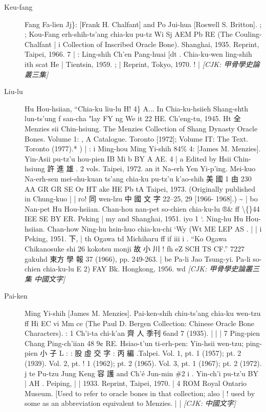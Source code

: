 \begin{description}
  \item[Keu-fang] Fang Fa-lien Jj\}: [Frank H. Chalfant] and Po Jui-hua [Roswell S. Britton]. ; ; Kou-Fang erh-shih-ts'ang chia-ku pu-tz Wi Sj AEM Pb RE (The Couling-Chalfant | i Collection of Inscribed Oracle Bone). Shanghai, 1935. Reprint, Taipei, 1966. 7 | : Ling-shih Ch'en Pang-huai [dt . Chia-ku-wen ling-shih ith scat He | Tientsin, 1959. ; | Reprint, Tokyo, 1970. ! | \hfill\textit{[CJK: 甲骨學史論叢三集]}
  \item[Liu-lu] Hu Hou-hsiian, ``Chia-ku liu-lu H! 4\} A... In Chia-ku-hsiieh Shang-shth lun-ts'ung f san-cha "lay FY ng We it 22 HE. Ch'eng-tu, 1945. Ht 全 Menzies sii Chin-hsiung. The Menzies Collection of Shang Dynasty Oracle Bones. Volume 1: , A Catalogue. Toronto [1972]; Volume IT: The Text. Toronto (1977).* ) | : i Ming-hou Ming Yi-shih 84\% 4: [James M. Menzies]. Yin-Asii pu-tz'u hou-pien IB Mi b BY A AE. 4 | a Edited by Hsii Chin-hsiung 許 進 雄 . 2 vols. Taipei, 1972. an it Na-erh Yen Yi-p'ing. Mei-kuo Na-erh-sen mei-shu-kuan ts'ang chia-ku pu-tz'u k'ao-shih 美 國 1 由 230 AA GR GR SE Or HT ake HE Pb tA Taipei, 1973. (Originally published in Chung-kuo | | ro! 同 wen-lzu 中 國 文 字 22--25, 29 [1966- 1968].) \~{} | bo Nan-pet Hu Hou-hsiian. Chan-hou nan-pet so-chien chia-ku-lu ®\& ff \textbackslash\{\}44 IEE SE BY ER. Peking | my and Shanghai, 1951. iyo 1 `. Ning-hu Hu Hou-hsiian. Chan-how Ning-hu hsin-huo chia-ku-chi `Wy (Wt ME LEP AS . | | i Peking, 1951. 下, | th Ogawa td Michiharu ff if iii i . ``Ko Ogawa Chikanosuke shi 26 kokotsu monji 故 小 川 ! fh eZ SCH TS CF.'' 7227 gakuhd 東方 學 報 37 (1966), pp. 249-263. | be Pa-li Jao Tsung-yi. Pa-li so-chien chia-ku-lu E 2) FAY Bk. Hongkong, 1956. wd \hfill\textit{[CJK: 甲骨學史論叢三集 中國文字]}
  \item[Pai-ken] Ming Yi-shih [James M. Menzies]. Pai-ken-shih chiu-ts'ang chia-ku wen-tzu ff Hi EC vi Mm ce (The Paul D. Bergen Collection: Chinese Oracle Bone Characters). : 1 Ch'i-ta chi-k'an 齊 人 季刊 6and 7 (1935). | | | 7 Ping-pien Chang Ping-ch'iian 48 9¢ RE. Hsiao-t'un ti-erh-pen: Yin-hsii wen-tzu; ping-pien 小 子 L : : 股 虛 交 字 : 丙 編 .Talpei. Vol. 1, pt. 1 (1957); pt. 2 (1939). Vol. 2, pt. ! 1 (1962); pt. 2 (1965). Vol. 3, pt. 1 (1967); pt. 2 (1972). j te Pu-tzu Jung Keng 容 護 and Ch'é Jun-min \#2 i . Yin-ch'i pu-tz'u BY | AH . Peiping, | | 1933. Reprint, Taipei, 1970. | 4 ROM Royal Ontario Museum. [Used to refer to oracle bones in that collection; also | ! used by some as an abbreviation equivalent to Menzies. | | \hfill\textit{[CJK: 中國文字]}

\end{description}
